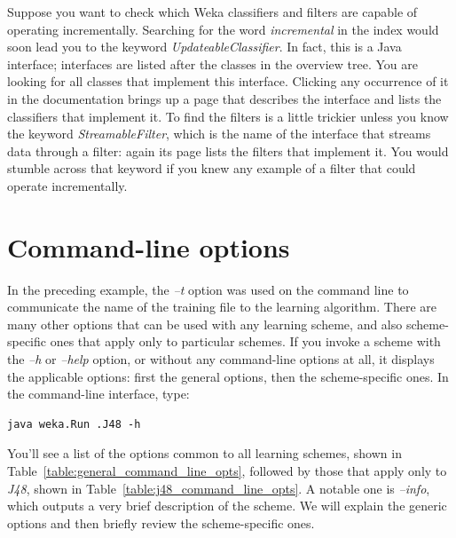 Suppose you want to check which Weka classifiers and filters are
capable of operating incrementally. Searching for the word \textit{incremental}
in the index would soon lead you to the keyword
\textit{UpdateableClassifier}. In fact, this is a Java interface; interfaces
are listed after the classes in the overview tree. You are looking for
all classes that implement this interface. Clicking any occurrence of
it in the documentation brings up a page that describes the interface
and lists the classifiers that implement it. To find the filters is a
little trickier unless you know the keyword \textit{StreamableFilter}, which is
the name of the interface that streams data through a filter: again
its page lists the filters that implement it. You would stumble across
that keyword if you knew any example of a filter that could operate
incrementally.

\section{Command-line options}
\label{section:command_line_opts}

In the preceding example, the \textit{--t} option was used on the
command line to communicate the name of the training file to the
learning algorithm. There are many other options that can be used with
any learning scheme, and also scheme-specific ones that apply only to
particular schemes. If you invoke a scheme with the \textit{--h}
or \textit{--help} option, or without any command-line options at all,
it displays the applicable options: first the general options, then
the scheme-specific ones. In the command-line interface, type:

\begin{Verbatim}[fontsize=\footnotesize]
java weka.Run .J48 -h
\end{Verbatim}

\noindent You'll see a list of the options common to all learning schemes, 
shown in Table~\ref{table:general_command_line_opts}, followed by
those that apply only to \textit{J48}, shown in
Table~\ref{table:j48_command_line_opts}. A notable one
is \textit{--info}, which outputs a very brief description of the
scheme. We will explain the generic options and then briefly review
the scheme-specific ones.

